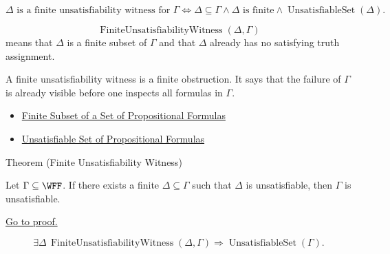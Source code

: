 \begin{remark*}
\[
\Delta\text{ is a finite unsatisfiability witness for }\Gamma
\Longleftrightarrow
\Delta\subseteq\Gamma\land \Delta\text{ is finite}\land
\operatorname{UnsatisfiableSet}(\Delta).
\]
\end{remark*}

\begin{remark*}
\[
\operatorname{FiniteUnsatisfiabilityWitness}(\Delta,\Gamma)
\]
means that \(\Delta\) is a finite subset of \(\Gamma\) and that \(\Delta\)
already has no satisfying truth assignment.
\end{remark*}

\begin{remark*}[Interpretation]
A finite unsatisfiability witness is a finite obstruction. It says that the
failure of \(\Gamma\) is already visible before one inspects all formulas in
\(\Gamma\).
\end{remark*}

\begin{dependencies}
\begin{itemize}
  \item \hyperref[def:finite-subset-of-set-of-propositional-formulas]{Finite Subset of a Set of Propositional Formulas}
  \item \hyperref[def:unsatisfiable-set-of-propositional-formulas]{Unsatisfiable Set of Propositional Formulas}
\end{itemize}
\end{dependencies}

\begin{theorembox}{Theorem (Finite Unsatisfiability Witness)}
\begin{theorem}
\label{thm:finite-unsatisfiability-witness-propositional-logic}
Let \(\Gamma\subseteq\WFF\). If there exists a finite
\(\Delta\subseteq\Gamma\) such that \(\Delta\) is unsatisfiable, then
\(\Gamma\) is unsatisfiable.

\medskip
\noindent\hyperref[prf:finite-unsatisfiability-witness-propositional-logic]{Go to proof.}
\end{theorem}
\end{theorembox}

\begin{remark*}
\[
\exists\Delta\,\operatorname{FiniteUnsatisfiabilityWitness}(\Delta,\Gamma)
\Rightarrow
\operatorname{UnsatisfiableSet}(\Gamma).
\]
\end{remark*}

